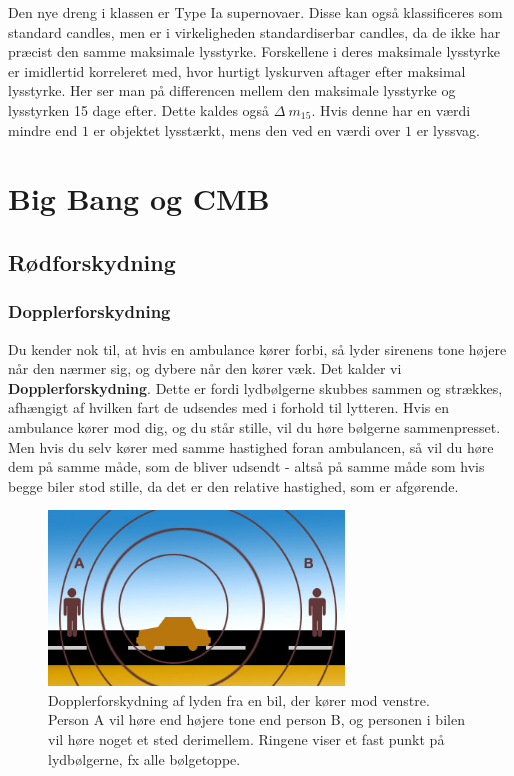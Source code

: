 Den nye dreng i klassen er Type Ia supernovaer. Disse kan også klassificeres som standard candles, men er i virkeligheden standardiserbar candles, da de ikke har præcist den samme maksimale lysstyrke. Forskellene i deres maksimale lysstyrke er imidlertid korreleret med, hvor hurtigt lyskurven aftager efter maksimal lysstyrke. Her ser man på differencen mellem den maksimale lysstyrke og lysstyrken 15 dage efter. Dette kaldes også $\Delta~m_{15}$. Hvis denne har en værdi mindre end $1$ er objektet lysstærkt, mens den ved en værdi over $1$ er lyssvag.

\section{Big Bang og CMB}

\subsection{Rødforskydning}
\subsubsection{Dopplerforskydning}
Du kender nok til, at hvis en ambulance kører forbi, så lyder sirenens tone højere når den nærmer sig, og dybere når den kører væk. Det kalder vi \textbf{Dopplerforskydning}. %
Dette er fordi lydbølgerne skubbes sammen og strækkes, afhængigt af hvilken fart de udsendes med i forhold til lytteren. Hvis en ambulance kører mod dig, og du står stille, vil du høre bølgerne sammenpresset. Men hvis du selv kører med samme hastighed foran ambulancen, så vil du høre dem på samme måde, som de bliver udsendt - altså på samme måde som hvis begge biler stod stille, da det er den relative hastighed, som er afgørende.

\begin{figure}[h!]
	\centering
	\includegraphics[width=0.7\textwidth]{Astrofysik/Astrofig/doppler.jpg}
	\caption{Dopplerforskydning af lyden fra en bil, der kører mod venstre. Person A vil høre end højere tone end person B, og personen i bilen vil høre noget et sted derimellem. Ringene viser et fast punkt på lydbølgerne, fx alle bølgetoppe.}
	\label{shapes}
\end{figure}

